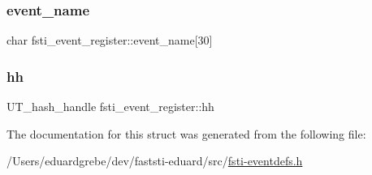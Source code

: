 \subsubsection{\texorpdfstring{event\+\_\+name}{event\_name}}
{\footnotesize\ttfamily char fsti\+\_\+event\+\_\+register\+::event\+\_\+name\mbox{[}30\mbox{]}}

\mbox{\label{structfsti__event__register_a0e7eff8a88f39452ca3e25ef6616ebbf}} 
\subsubsection{\texorpdfstring{hh}{hh}}
{\footnotesize\ttfamily U\+T\+\_\+hash\+\_\+handle fsti\+\_\+event\+\_\+register\+::hh}



The documentation for this struct was generated from the following file\+:\begin{DoxyCompactItemize}
\item 
/\+Users/eduardgrebe/dev/faststi-\/eduard/src/\mbox{\hyperlink{fsti-eventdefs_8h}{fsti-\/eventdefs.\+h}}\end{DoxyCompactItemize}
